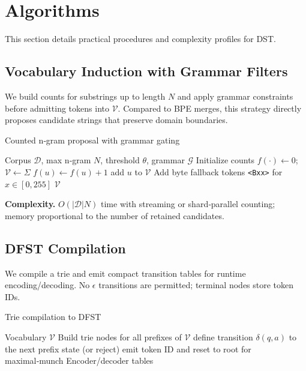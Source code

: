 \section{Algorithms}
\label{sec:algorithms}

This section details practical procedures and complexity profiles for DST.

\subsection{Vocabulary Induction with Grammar Filters}

We build counts for substrings up to length $N$ and apply grammar constraints before admitting tokens into $\mathcal{V}$. Compared to BPE merges, this strategy directly proposes candidate strings that preserve domain boundaries.

\begin{algorithm}[H]
\caption{Counted n‑gram proposal with grammar gating}
\label{alg:ngram}
\begin{algorithmic}[1]
\REQUIRE Corpus $\mathcal{D}$, max n‑gram $N$, threshold $\theta$, grammar $\mathcal{G}$
\STATE Initialize counts $f(\cdot) \leftarrow 0$; $\mathcal{V} \leftarrow \Sigma$
  
  \STATE $f(u) \leftarrow f(u)+1$
\ENDFOR \ENDFOR \ENDFOR
{}
    \STATE add $u$ to $\mathcal{V}$
  \ENDIF
\ENDFOR
\STATE Add byte fallback tokens \texttt{<Bxx>} for $x\in[0,255]$
\RETURN $\mathcal{V}$
\end{algorithmic}
\end{algorithm}

\textbf{Complexity.} $O(|\mathcal{D}|N)$ time with streaming or shard‑parallel counting; memory proportional to the number of retained candidates.

\subsection{DFST Compilation}

We compile a trie and emit compact transition tables for runtime encoding/decoding. No $\epsilon$ transitions are permitted; terminal nodes store token IDs.

\begin{algorithm}[H]
\caption{Trie compilation to DFST}
\label{alg:compile}
\begin{algorithmic}[1]
\REQUIRE Vocabulary $\mathcal{V}$
\STATE Build trie nodes for all prefixes of $\mathcal{V}$
  \STATE define transition $\delta(q,a)$ to the next prefix state (or reject)
    \STATE emit token ID and reset to root for maximal‑munch
  \ENDIF
\ENDFOR
\RETURN Encoder/decoder tables
\end{algorithmic}
\end{algorithm}

